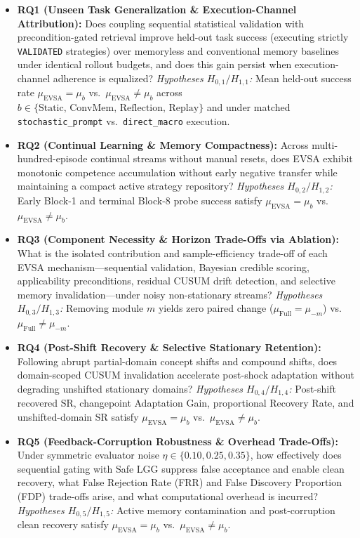 \documentclass[10pt,letterpaper]{article}
\begin{document}
\begin{itemize}
  \item \textbf{RQ1 (Unseen Task Generalization \& Execution-Channel Attribution):} Does coupling sequential statistical validation with precondition-gated retrieval improve held-out task success (executing strictly \texttt{VALIDATED} strategies) over memoryless and conventional memory baselines under identical rollout budgets, and does this gain persist when execution-channel adherence is equalized?
  \emph{Hypotheses $H_{0,1} / H_{1,1}$:} Mean held-out success rate $\mu_{\mathrm{EVSA}} = \mu_{b}$ vs.\ $\mu_{\mathrm{EVSA}} \neq \mu_{b}$ across $b \in \{\text{Static, ConvMem, Reflection, Replay}\}$ and under matched \texttt{stochastic\_prompt} vs.\ \texttt{direct\_macro} execution.
  \item \textbf{RQ2 (Continual Learning \& Memory Compactness):} Across multi-hundred-episode continual streams without manual resets, does EVSA exhibit monotonic competence accumulation without early negative transfer while maintaining a compact active strategy repository?
  \emph{Hypotheses $H_{0,2} / H_{1,2}$:} Early Block-1 and terminal Block-8 probe success satisfy $\mu_{\mathrm{EVSA}} = \mu_{b}$ vs.\ $\mu_{\mathrm{EVSA}} \neq \mu_{b}$.
  \item \textbf{RQ3 (Component Necessity \& Horizon Trade-Offs via Ablation):} What is the isolated contribution and sample-efficiency trade-off of each EVSA mechanism—sequential validation, Bayesian credible scoring, applicability preconditions, residual CUSUM drift detection, and selective memory invalidation—under noisy non-stationary streams?
  \emph{Hypotheses $H_{0,3} / H_{1,3}$:} Removing module $m$ yields zero paired change ($\mu_{\mathrm{Full}} = \mu_{-m}$) vs.\ $\mu_{\mathrm{Full}} \neq \mu_{-m}$.
  \item \textbf{RQ4 (Post-Shift Recovery \& Selective Stationary Retention):} Following abrupt partial-domain concept shifts and compound shifts, does domain-scoped CUSUM invalidation accelerate post-shock adaptation without degrading unshifted stationary domains?
  \emph{Hypotheses $H_{0,4} / H_{1,4}$:} Post-shift recovered SR, changepoint Adaptation Gain, proportional Recovery Rate, and unshifted-domain SR satisfy $\mu_{\mathrm{EVSA}} = \mu_{b}$ vs.\ $\mu_{\mathrm{EVSA}} \neq \mu_{b}$.
  \item \textbf{RQ5 (Feedback-Corruption Robustness \& Overhead Trade-Offs):} Under symmetric evaluator noise $\eta \in \{0.10, 0.25, 0.35\}$, how effectively does sequential gating with Safe LGG suppress false acceptance and enable clean recovery, what False Rejection Rate (FRR) and False Discovery Proportion (FDP) trade-offs arise, and what computational overhead is incurred?
  \emph{Hypotheses $H_{0,5} / H_{1,5}$:} Active memory contamination and post-corruption clean recovery satisfy $\mu_{\mathrm{EVSA}} = \mu_{b}$ vs.\ $\mu_{\mathrm{EVSA}} \neq \mu_{b}$.
\end{itemize}
\end{document}
